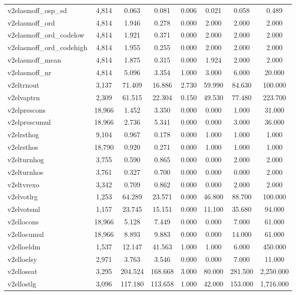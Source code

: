 \begin{table}[!htbp]
\begin{tabular}{@{\extracolsep{5pt}}lccccccc}
v2elasmoff\_osp\_sd & 4,814 & 0.063 & 0.081 & 0.006 & 0.021 & 0.058 & 0.489 \\ 
v2elasmoff\_ord & 4,814 & 1.946 & 0.278 & 0.000 & 2.000 & 2.000 & 2.000 \\ 
v2elasmoff\_ord\_codelow & 4,814 & 1.921 & 0.371 & 0.000 & 2.000 & 2.000 & 2.000 \\ 
v2elasmoff\_ord\_codehigh & 4,814 & 1.955 & 0.255 & 0.000 & 2.000 & 2.000 & 2.000 \\ 
v2elasmoff\_mean & 4,814 & 1.875 & 0.315 & 0.000 & 1.924 & 2.000 & 2.000 \\ 
v2elasmoff\_nr & 4,814 & 5.096 & 3.354 & 1.000 & 3.000 & 6.000 & 20.000 \\ 
v2eltrnout & 3,137 & 71.409 & 16.886 & 2.730 & 59.990 & 84.630 & 100.000 \\ 
v2elvaptrn & 2,309 & 61.515 & 22.304 & 0.150 & 49.530 & 77.480 & 223.700 \\ 
v2elprescons & 18,966 & 1.452 & 3.350 & 0.000 & 0.000 & 1.000 & 31.000 \\ 
v2elprescumul & 18,966 & 2.736 & 5.341 & 0.000 & 0.000 & 3.000 & 36.000 \\ 
v2elrsthog & 9,104 & 0.967 & 0.178 & 0.000 & 1.000 & 1.000 & 1.000 \\ 
v2elrsthos & 18,790 & 0.920 & 0.271 & 0.000 & 1.000 & 1.000 & 1.000 \\ 
v2elturnhog & 3,755 & 0.590 & 0.865 & 0.000 & 0.000 & 2.000 & 2.000 \\ 
v2elturnhos & 3,761 & 0.327 & 0.700 & 0.000 & 0.000 & 0.000 & 2.000 \\ 
v2eltvrexo & 3,342 & 0.709 & 0.862 & 0.000 & 0.000 & 2.000 & 2.000 \\ 
v2elvotlrg & 1,253 & 64.289 & 23.571 & 0.000 & 46.800 & 88.700 & 100.000 \\ 
v2elvotsml & 1,157 & 23.745 & 15.151 & 0.000 & 11.100 & 35.680 & 94.000 \\ 
v2ellocons & 18,966 & 5.128 & 7.449 & 0.000 & 0.000 & 7.000 & 61.000 \\ 
v2ellocumul & 18,966 & 8.893 & 9.883 & 0.000 & 0.000 & 14.000 & 61.000 \\ 
v2elloeldm & 1,537 & 12.147 & 41.563 & 1.000 & 1.000 & 6.000 & 450.000 \\ 
v2elloelsy & 2,971 & 3.763 & 3.546 & 0.000 & 0.000 & 7.000 & 11.000 \\ 
v2elloseat & 3,295 & 204.524 & 168.668 & 3.000 & 80.000 & 281.500 & 2,250.000 \\ 
v2ellostlg & 3,096 & 117.180 & 113.658 & 1.000 & 42.000 & 153.000 & 1,716.000 \\ 

\end{tabular}
\end{table}
